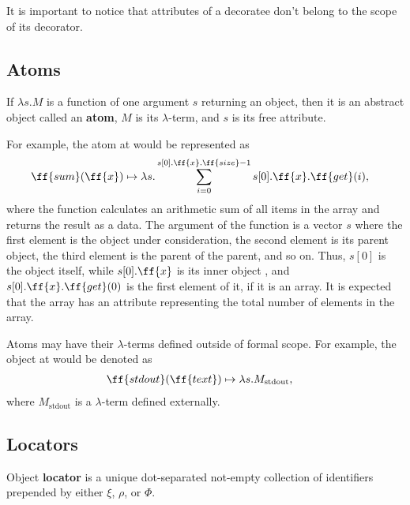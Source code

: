 It is important to notice that attributes of a decoratee
don't belong to the scope of its decorator.

\subsection{Atoms}

\begin{eodefinition}\label{def:atom}
If $\lambda s.M$ is a function of one argument $s$ returning an object,
then it is an abstract object called an \textbf{atom}, $M$ is its $\lambda$-term,
and $s$ is its free attribute.
\end{eodefinition}

For example, the atom at  would be represented as
\begin{equation}
\begin{split}
& \ff{sum}(\ff{x}) \mapsto \lambda s . \sum\limits_{i=0}^{s[0].\ff{x}.\ff{size} - 1} s[0].\ff{x}.\ff{get}(i),
\end{split}
\end{equation}
where the function calculates an arithmetic sum of all items
in the array  and returns the result as a data. The argument of
the function is a vector $s$ where the first element is the object under
consideration, the second element is its parent object, the third element
is the parent of the parent, and so on. Thus, $s[0]$ is the object
 itself, while $s[0].\ff{x}$ is its inner object ,
and $s[0].\ff{x}.\ff{get}(0)$ is the first element of it, if it is an array.
It is expected that the array has an attribute  representing
the total number of elements in the array.

Atoms may have their $\lambda$-terms defined outside of \phic{} formal scope.
For example, the object at  would be denoted as
\begin{equation}\label{def:stdout}
\begin{split}
& \ff{stdout}(\ff{text}) \mapsto \lambda s.M_\text{stdout},
\end{split}
\end{equation}
where $M_\text{stdout}$ is a $\lambda$-term defined externally.

\subsection{Locators}

\begin{eodefinition}\label{def:locator}
Object \textbf{locator} is a unique dot-separated not-empty
collection of identifiers prepended by either $\xi$, $\rho$, or $\Phi$.
\end{eodefinition}

